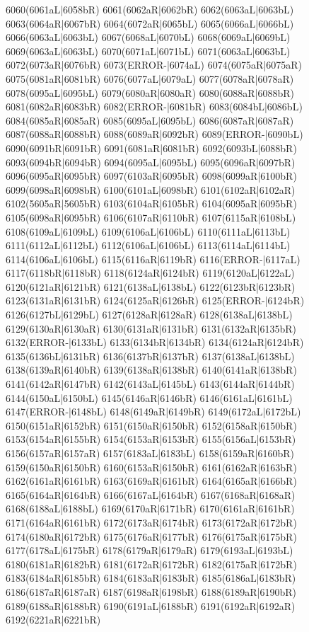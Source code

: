 6060(6061aL|6058bR) 6061(6062aR|6062bR) 6062(6063aL|6063bL) 6063(6064aR|6067bR) 6064(6072aR|6065bL) 6065(6066aL|6066bL) \\6066(6063aL|6063bL) 6067(6068aL|6070bL) 6068(6069aL|6069bL) 6069(6063aL|6063bL) 6070(6071aL|6071bL) 6071(6063aL|6063bL) 6072(6073aR|6076bR) 6073(ERROR-|6074aL) 6074(6075aR|6075aR) \\6075(6081aR|6081bR) 6076(6077aL|6079aL) 6077(6078aR|6078aR) 6078(6095aL|6095bL) 6079(6080aR|6080aR) 6080(6088aR|6088bR) 6081(6082aR|6083bR) 6082(ERROR-|6081bR) 6083(6084bL|6086bL) \\6084(6085aR|6085aR) 6085(6095aL|6095bL) 6086(6087aR|6087aR) 6087(6088aR|6088bR) 6088(6089aR|6092bR) 6089(ERROR-|6090bL) 6090(6091bR|6091bR) 6091(6081aR|6081bR) 6092(6093bL|6088bR) \\6093(6094bR|6094bR) 6094(6095aL|6095bL) 6095(6096aR|6097bR) 6096(6095aR|6095bR) 6097(6103aR|6095bR) 6098(6099aR|6100bR) 6099(6098aR|6098bR) 6100(6101aL|6098bR) 6101(6102aR|6102aR) \\6102(5605aR|5605bR) 6103(6104aR|6105bR) 6104(6095aR|6095bR) 6105(6098aR|6095bR) 6106(6107aR|6110bR) 6107(6115aR|6108bL) 6108(6109aL|6109bL) 6109(6106aL|6106bL) 6110(6111aL|6113bL) \\6111(6112aL|6112bL) 6112(6106aL|6106bL) 6113(6114aL|6114bL) 6114(6106aL|6106bL) 6115(6116aR|6119bR) 6116(ERROR-|6117aL) 6117(6118bR|6118bR) 6118(6124aR|6124bR) 6119(6120aL|6122aL) \\6120(6121aR|6121bR) 6121(6138aL|6138bL) 6122(6123bR|6123bR) 6123(6131aR|6131bR) 6124(6125aR|6126bR) 6125(ERROR-|6124bR) 6126(6127bL|6129bL) 6127(6128aR|6128aR) 6128(6138aL|6138bL) \\6129(6130aR|6130aR) 6130(6131aR|6131bR) 6131(6132aR|6135bR) 6132(ERROR-|6133bL) 6133(6134bR|6134bR) 6134(6124aR|6124bR) 6135(6136bL|6131bR) 6136(6137bR|6137bR) 6137(6138aL|6138bL) \\6138(6139aR|6140bR) 6139(6138aR|6138bR) 6140(6141aR|6138bR) 6141(6142aR|6147bR) 6142(6143aL|6145bL) 6143(6144aR|6144bR) 6144(6150aL|6150bL) 6145(6146aR|6146bR) 6146(6161aL|6161bL) \\6147(ERROR-|6148bL) 6148(6149aR|6149bR) 6149(6172aL|6172bL) 6150(6151aR|6152bR) 6151(6150aR|6150bR) 6152(6158aR|6150bR) 6153(6154aR|6155bR) 6154(6153aR|6153bR) 6155(6156aL|6153bR) \\6156(6157aR|6157aR) 6157(6183aL|6183bL) 6158(6159aR|6160bR) 6159(6150aR|6150bR) 6160(6153aR|6150bR) 6161(6162aR|6163bR) 6162(6161aR|6161bR) 6163(6169aR|6161bR) 6164(6165aR|6166bR) \\6165(6164aR|6164bR) 6166(6167aL|6164bR) 6167(6168aR|6168aR) 6168(6188aL|6188bL) 6169(6170aR|6171bR) 6170(6161aR|6161bR) 6171(6164aR|6161bR) 6172(6173aR|6174bR) 6173(6172aR|6172bR) \\6174(6180aR|6172bR) 6175(6176aR|6177bR) 6176(6175aR|6175bR) 6177(6178aL|6175bR) 6178(6179aR|6179aR) 6179(6193aL|6193bL) 6180(6181aR|6182bR) 6181(6172aR|6172bR) 6182(6175aR|6172bR) \\6183(6184aR|6185bR) 6184(6183aR|6183bR) 6185(6186aL|6183bR) 6186(6187aR|6187aR) 6187(6198aR|6198bR) 6188(6189aR|6190bR) 6189(6188aR|6188bR) 6190(6191aL|6188bR) 6191(6192aR|6192aR) \\6192(6221aR|6221bR) 